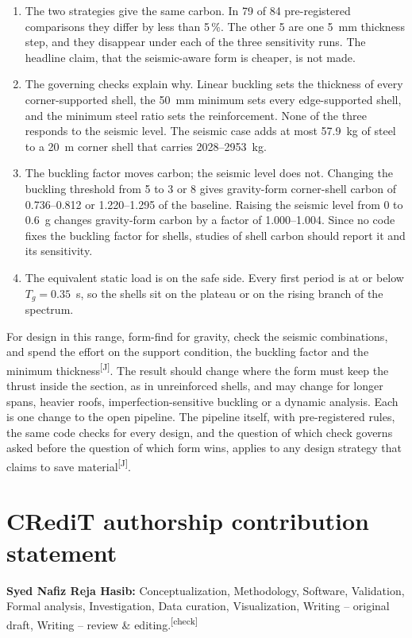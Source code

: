 \documentclass[preprint,12pt]{elsarticle}
\newcommand{\chk}{\textsuperscript{\textcolor{markcol}{\sffamily\scriptsize[check]}}}
\newcommand{\jud}{\textsuperscript{\textcolor{markcol}{\sffamily\scriptsize[J]}}}
\newcommand{\chk}{}
\newcommand{\jud}{}
\begin{document}
\begin{enumerate}
\item The two strategies give the same carbon. In 79 of 84 pre-registered comparisons they differ by less than 5\,\%. The other 5 are one 5~mm thickness step, and they disappear under each of the three sensitivity runs. The headline claim, that the seismic-aware form is cheaper, is not made.
\item The governing checks explain why. Linear buckling sets the thickness of every corner-supported shell, the 50~mm minimum sets every edge-supported shell, and the minimum steel ratio sets the reinforcement. None of the three responds to the seismic level. The seismic case adds at most 57.9~kg of steel to a 20~m corner shell that carries 2028--2953~kg.
\item The buckling factor moves carbon; the seismic level does not. Changing the buckling threshold from 5 to 3 or 8 gives gravity-form corner-shell carbon of 0.736--0.812 or 1.220--1.295 of the baseline. Raising the seismic level from 0 to 0.6~g changes gravity-form carbon by a factor of 1.000--1.004. Since no code fixes the buckling factor for shells, studies of shell carbon should report it and its sensitivity.
\item The equivalent static load is on the safe side. Every first period is at or below $T_g = 0.35$~s, so the shells sit on the plateau or on the rising branch of the spectrum.
\end{enumerate}

For design in this range, form-find for gravity, check the seismic combinations, and spend the effort on the support condition, the buckling factor and the minimum thickness\jud. The result should change where the form must keep the thrust inside the section, as in unreinforced shells, and may change for longer spans, heavier roofs, imperfection-sensitive buckling or a dynamic analysis. Each is one change to the open pipeline. The pipeline itself, with pre-registered rules, the same code checks for every design, and the question of which check governs asked before the question of which form wins, applies to any design strategy that claims to save material\jud.

\section*{CRediT authorship contribution statement}

\textbf{Syed Nafiz Reja Hasib:} Conceptualization, Methodology, Software, Validation, Formal analysis, Investigation, Data curation, Visualization, Writing -- original draft, Writing -- review \& editing.\chk
\end{document}
